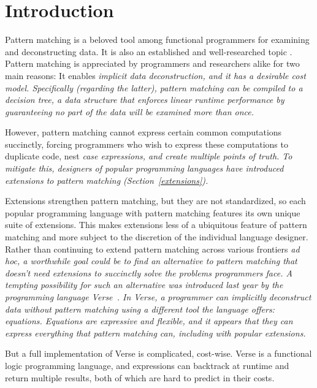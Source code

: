 \documentclass[manuscript,screen,review, 12pt, nonacm]{acmart}
\begin{document}
\section{Introduction}

Pattern matching is a beloved tool among functional programmers for examining
and deconstructing data. 
It is also an established and well-researched topic \citep{wadler1987views, macqueen1985tree, burton1993pattern,
palao1996new, maranget, bpc}. Pattern matching is appreciated by programmers and
researchers alike for two main reasons: It enables \it{implicit} data
deconstruction, and it has a desirable cost model. Specifically (regarding the
latter), pattern matching can be compiled to a \it{decision tree}, a data
structure that enforces linear runtime performance by guaranteeing no part of
the data will be examined more than once.~\citep{maranget}

However, pattern matching cannot express certain common computations succinctly,
forcing programmers who wish to express these computations to duplicate code,
nest \it{case} expressions, and create multiple points of truth. To mitigate
this, designers of popular programming languages have introduced \it{extensions}
to pattern matching (Section~\ref{extensions}). 

Extensions strengthen pattern matching, but they are not standardized, so each
popular programming language with pattern matching features its own unique suite
of extensions. This makes extensions less of a ubiquitous feature of pattern
matching and more subject to the discretion of the individual language designer.
Rather than continuing to extend pattern matching across various frontiers
\it{ad hoc}, a worthwhile goal could be to find an alternative to pattern
matching that doesn't need extensions to succinctly solve the problems
programmers face. A tempting possibility for such an alternative was introduced
last year by the programming language Verse~\citep{verse}. In Verse, a
programmer can implicitly deconstruct data without pattern matching using a
different tool the language offers: \it{equations}. Equations are expressive and
flexible, and it appears that they can express everything that pattern matching
can, including with popular extensions. 

But a full implementation of Verse is complicated, cost-wise. Verse is a
functional logic programming language, and expressions can backtrack at runtime
and return multiple results, both of which are hard to predict in their costs. 
\end{document}
